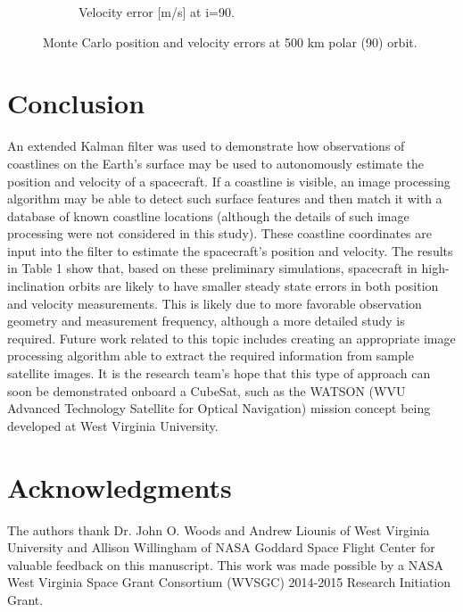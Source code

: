 \documentclass[]{aiaa-tc}%
\begin{document}
\begin{figure}[h!]
\begin{subfigure}{.49\textwidth}
		\caption{Velocity error [m/s] at i=90\degree.}
		\label{fig:mcvel90_500}
	\end{subfigure}
	\caption{Monte Carlo position and velocity errors at 500 km polar (90\degree) orbit.}
	\label{fig:mc90_500}
\end{figure}
\clearpage
\section{Conclusion}
An extended Kalman filter was used to demonstrate how observations of coastlines on the Earth's surface may be used to autonomously estimate the position and velocity of a spacecraft. If a coastline is visible, an image processing algorithm may be able to detect such surface features and then match it with a database of known coastline locations (although the details of such image processing were not considered in this study). These coastline coordinates are input into the filter to estimate the spacecraft's position and velocity. The results in Table 1 show that, based on these preliminary simulations, spacecraft in high-inclination orbits are likely to have smaller steady state errors in both position and velocity measurements. This is likely due to more favorable observation geometry and measurement frequency, although a more detailed study is required. Future work related to this topic includes creating an appropriate image processing algorithm able to extract the required information from sample satellite images. It is the research team's hope that this type of approach can soon be demonstrated onboard a CubeSat, such as the WATSON (WVU Advanced Technology Satellite for Optical Navigation) mission concept being developed at West Virginia University.

\section{Acknowledgments}
The authors thank Dr. John O. Woods and Andrew Liounis of West Virginia University and Allison Willingham of NASA Goddard Space Flight Center for valuable feedback on this manuscript. This work was made possible by a NASA West Virginia Space Grant Consortium (WVSGC) 2014-2015 Research Initiation Grant. 



\end{document}
